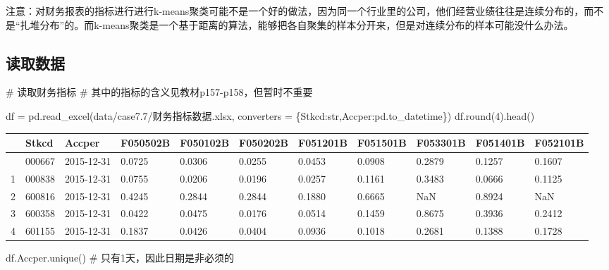 \documentclass[
  letterpaper,
  DIV=11,
  numbers=noendperiod]{scrreprt}
\newenvironment{Shaded}{\begin{snugshade}}{\end{snugshade}}
\newcommand{\BuiltInTok}[1]{\textcolor[rgb]{0.00,0.23,0.31}{#1}}
\newcommand{\CommentTok}[1]{\textcolor[rgb]{0.37,0.37,0.37}{#1}}
\newcommand{\DecValTok}[1]{\textcolor[rgb]{0.68,0.00,0.00}{#1}}
\newcommand{\NormalTok}[1]{\textcolor[rgb]{0.00,0.23,0.31}{#1}}
\newcommand{\OperatorTok}[1]{\textcolor[rgb]{0.37,0.37,0.37}{#1}}
\newcommand{\StringTok}[1]{\textcolor[rgb]{0.13,0.47,0.30}{#1}}
\begin{document}
注意：对财务报表的指标进行进行k-means聚类可能不是一个好的做法，因为同一个行业里的公司，他们经营业绩往往是连续分布的，而不是``扎堆分布''的。而k-means聚类是一个基于距离的算法，能够把各自聚集的样本分开来，但是对连续分布的样本可能没什么办法。

\hypertarget{ux8bfbux53d6ux6570ux636e-1}{%
\subsection{读取数据}\label{ux8bfbux53d6ux6570ux636e-1}}

\begin{Shaded}
\begin{Highlighting}[]
\CommentTok{\# 读取财务指标}
\CommentTok{\# 其中的指标的含义见教材p157{-}p158，但暂时不重要}

\NormalTok{df }\OperatorTok{=}\NormalTok{ pd.read\_excel(}\StringTok{\textquotesingle{}data/case7.7/财务指标数据.xlsx\textquotesingle{}}\NormalTok{,}
\NormalTok{                converters }\OperatorTok{=}\NormalTok{ \{}\StringTok{\textquotesingle{}Stkcd\textquotesingle{}}\NormalTok{:}\BuiltInTok{str}\NormalTok{,}\StringTok{\textquotesingle{}Accper\textquotesingle{}}\NormalTok{:pd.to\_datetime\})}
\NormalTok{df.}\BuiltInTok{round}\NormalTok{(}\DecValTok{4}\NormalTok{).head()}
\end{Highlighting}
\end{Shaded}

\begin{longtable}[]{@{}lllllllllll@{}}
\toprule\noalign{}
& Stkcd & Accper & F050502B & F050102B & F050202B & F051201B & F051501B
& F053301B & F051401B & F052101B \\
\midrule\noalign{}
\endhead
\bottomrule\noalign{}
\endlastfoot
0 & 000667 & 2015-12-31 & 0.0725 & 0.0306 & 0.0255 & 0.0453 & 0.0908 &
0.2879 & 0.1257 & 0.1607 \\
1 & 000838 & 2015-12-31 & 0.0755 & 0.0206 & 0.0196 & 0.0257 & 0.1161 &
0.3483 & 0.0666 & 0.1125 \\
2 & 600816 & 2015-12-31 & 0.4245 & 0.2844 & 0.2844 & 0.1880 & 0.6665 &
NaN & 0.8924 & NaN \\
3 & 600358 & 2015-12-31 & 0.0422 & 0.0475 & 0.0176 & 0.0514 & 0.1459 &
0.8675 & 0.3936 & 0.2412 \\
4 & 601155 & 2015-12-31 & 0.1837 & 0.0426 & 0.0404 & 0.0936 & 0.1018 &
0.2681 & 0.1388 & 0.1728 \\
\end{longtable}

\begin{Shaded}
\begin{Highlighting}[]
\NormalTok{df.Accper.unique() }\CommentTok{\# 只有1天，因此日期是非必须的}
\end{Highlighting}
\end{Shaded}
\end{document}
